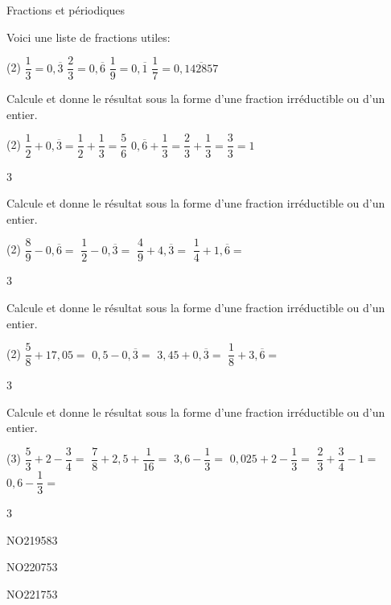 \documentclass[a4paper,11pt]{report}
\begin{document}
\begin{resolu}{Fractions et périodiques}{Voici une liste de fractions utiles:
		\begin{tasks}(2)
    \task $\dfrac{1}{3}=0,\overline{3} $
    \task $\dfrac{2}{3}=0,\overline{6} $
    \task $\dfrac{1}{9}=0,\overline{1}$
    \task $\dfrac{1}{7}=0,\overline{142857}$
\end{tasks}

Calcule et donne le résultat sous la forme d'une fraction irréductible ou d'un entier. 

\begin{tasks}(2)
    \task $\dfrac{1}{2}+0,\overline{3}=\dfrac{1}{2}+ \dfrac{1}{3}=\dfrac{5}{6}$
   \task $0,\overline{6}+\dfrac{1}{3}=\dfrac{2}{3}+\dfrac{1}{3}=\dfrac{3}{3}=1$
\end{tasks}}
{3}
\end{resolu}

\begin{exo}
{Calcule et donne le résultat sous la forme d'une fraction irréductible ou d'un entier.

	\begin{tasks}(2)
\task $\dfrac{8}{9}-0,\overline{6}=$
\task$\dfrac{1}{2}-0,\overline{3}=$
\task $\dfrac{4}{9}+4,\overline{3}=$
\task $\dfrac{1}{4}+1,\overline{6}=$
\end{tasks}}
{3}
\end{exo}

\begin{exo}
 {Calcule et donne le résultat sous la forme d'une fraction irréductible ou d'un entier.

	 \begin{tasks}(2)
\task $\dfrac{5}{8}+17,05=$
\task$0,5-0,\overline{3}=$
\task $ 3,45+0,\overline{3}=$
\task $\dfrac{1}{8}+3,\overline{6}=$
\end{tasks}
}
{3}
\end{exo}

\begin{exo}
 {Calcule et donne le résultat sous la forme d'une fraction irréductible ou d'un entier.
\begin{tasks}(3)
 \task  $\dfrac{5}{3}+2-\dfrac{3}{4}=$
 \task  $\dfrac{7}{8}+2,5+\dfrac{1}{16}=$
 \task $3,6-\dfrac{1}{3}=$
 \task  $0,025+2-\dfrac{1}{3}=$
 \task  $\dfrac{2}{3}+\dfrac{3}{4}-1=$
 \task $0,6-\dfrac{1}{3}=$
\end{tasks}
}{3}
\end{exo}



\begin{exol}{NO219}{58}{3}
\end{exol}
\begin{exof}{NO220}{75}{3}
\end{exof}
\begin{exof}{NO221}{75}{3}
\end{exof}
\end{document}

